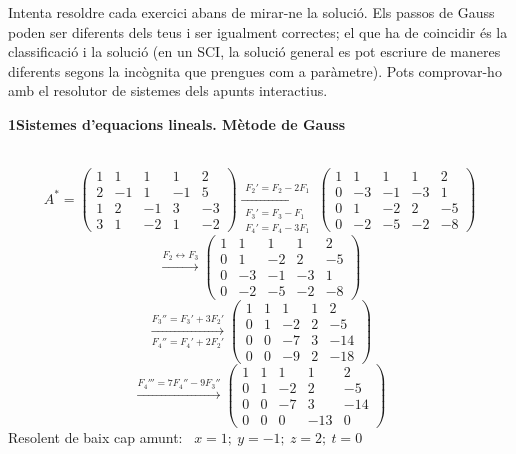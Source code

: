 \documentclass[11pt,a4paper]{article}
\newcounter{exer}
\newcommand{\ex}[1]{\par\needspace{4\baselineskip}\medskip\refstepcounter{exer}\noindent{\color{navy}\bfseries\theexer.}\ \ }
\newcommand{\seccio}[2]{\par\needspace{10\baselineskip}\bigskip
  \begin{tcolorbox}[colback=navy,colframe=navy,coltext=white,arc=2mm,boxrule=0pt,left=3mm,right=3mm,top=1.2mm,bottom=1.2mm]
  {\large\bfseries #1\quad #2}
  \end{tcolorbox}\vspace{-2pt}}
\newcommand{\res}[1]{\boxed{#1}}\newcommand{\rest}[1]{\fbox{#1}}
\begin{document}
\thispagestyle{primera}

\vspace{8pt}

\begin{tcolorbox}[colback=soft,colframe=soft,arc=2mm,left=3mm,right=3mm,top=1.5mm,bottom=1.5mm]
\small Intenta resoldre cada exercici abans de mirar-ne la solució. Els passos de Gauss poden ser diferents dels teus i ser igualment correctes; el que ha de coincidir és la classificació i la solució (en un SCI, la solució general es pot escriure de maneres diferents segons la incògnita que prengues com a paràmetre). Pots comprovar-ho amb el resolutor de sistemes dels apunts interactius.
\end{tcolorbox}

\seccio{1}{Sistemes d'equacions lineals. Mètode de Gauss}

\ex{1} \label{ex:g4}\[A^*=\left(\begin{array}{rrrr|r}1 & 1 & 1 & 1 & 2\\2 & -1 & 1 & -1 & 5\\1 & 2 & -1 & 3 & -3\\3 & 1 & -2 & 1 & -2\end{array}\right)\xrightarrow[\substack{F_3'=F_3-F_1\\F_4'=F_4-3F_1}]{F_2'=F_2-2F_1}\left(\begin{array}{rrrr|r}1 & 1 & 1 & 1 & 2\\0 & -3 & -1 & -3 & 1\\0 & 1 & -2 & 2 & -5\\0 & -2 & -5 & -2 & -8\end{array}\right)\]\[\xrightarrow{F_2\leftrightarrow F_3}\left(\begin{array}{rrrr|r}1 & 1 & 1 & 1 & 2\\0 & 1 & -2 & 2 & -5\\0 & -3 & -1 & -3 & 1\\0 & -2 & -5 & -2 & -8\end{array}\right)\]\[\xrightarrow[F_4''=F_4'+2F_2']{F_3''=F_3'+3F_2'}\left(\begin{array}{rrrr|r}1 & 1 & 1 & 1 & 2\\0 & 1 & -2 & 2 & -5\\0 & 0 & -7 & 3 & -14\\0 & 0 & -9 & 2 & -18\end{array}\right)\]\[\xrightarrow{F_4'''=7F_4''-9F_3''}\left(\begin{array}{rrrr|r}1 & 1 & 1 & 1 & 2\\0 & 1 & -2 & 2 & -5\\0 & 0 & -7 & 3 & -14\\0 & 0 & 0 & -13 & 0\end{array}\right)\]Resolent de baix cap amunt: \ $\res{x=1;\ y=-1;\ z=2;\ t=0}$
\end{document}
